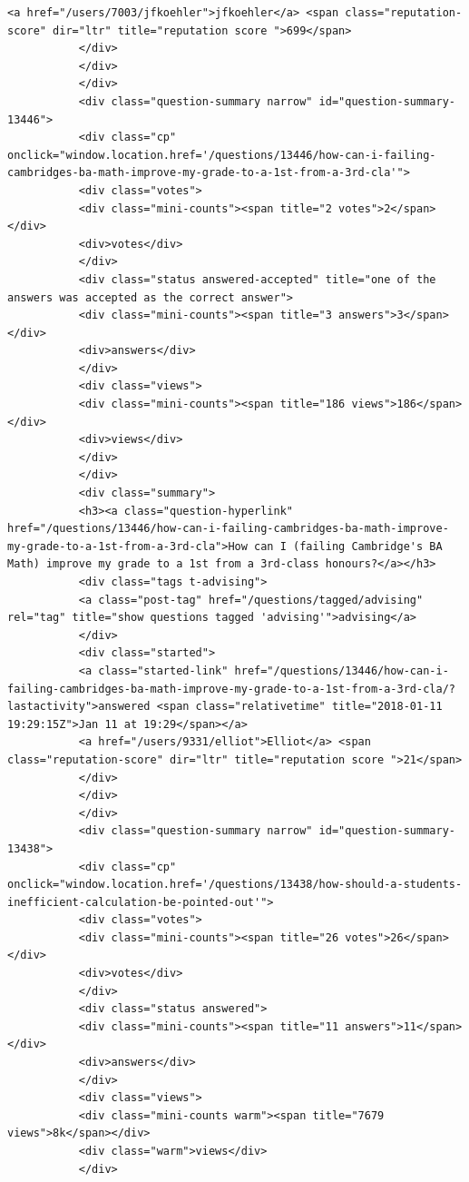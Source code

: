 \documentclass[11pt]{article}
\begin{document}
\begin{Verbatim}[commandchars=\\\{\}]
           <a href="/users/7003/jfkoehler">jfkoehler</a> <span class="reputation-score" dir="ltr" title="reputation score ">699</span>
           </div>
           </div>
           </div>
           <div class="question-summary narrow" id="question-summary-13446">
           <div class="cp" onclick="window.location.href='/questions/13446/how-can-i-failing-cambridges-ba-math-improve-my-grade-to-a-1st-from-a-3rd-cla'">
           <div class="votes">
           <div class="mini-counts"><span title="2 votes">2</span></div>
           <div>votes</div>
           </div>
           <div class="status answered-accepted" title="one of the answers was accepted as the correct answer">
           <div class="mini-counts"><span title="3 answers">3</span></div>
           <div>answers</div>
           </div>
           <div class="views">
           <div class="mini-counts"><span title="186 views">186</span></div>
           <div>views</div>
           </div>
           </div>
           <div class="summary">
           <h3><a class="question-hyperlink" href="/questions/13446/how-can-i-failing-cambridges-ba-math-improve-my-grade-to-a-1st-from-a-3rd-cla">How can I (failing Cambridge's BA Math) improve my grade to a 1st from a 3rd-class honours?</a></h3>
           <div class="tags t-advising">
           <a class="post-tag" href="/questions/tagged/advising" rel="tag" title="show questions tagged 'advising'">advising</a>
           </div>
           <div class="started">
           <a class="started-link" href="/questions/13446/how-can-i-failing-cambridges-ba-math-improve-my-grade-to-a-1st-from-a-3rd-cla/?lastactivity">answered <span class="relativetime" title="2018-01-11 19:29:15Z">Jan 11 at 19:29</span></a>
           <a href="/users/9331/elliot">Elliot</a> <span class="reputation-score" dir="ltr" title="reputation score ">21</span>
           </div>
           </div>
           </div>
           <div class="question-summary narrow" id="question-summary-13438">
           <div class="cp" onclick="window.location.href='/questions/13438/how-should-a-students-inefficient-calculation-be-pointed-out'">
           <div class="votes">
           <div class="mini-counts"><span title="26 votes">26</span></div>
           <div>votes</div>
           </div>
           <div class="status answered">
           <div class="mini-counts"><span title="11 answers">11</span></div>
           <div>answers</div>
           </div>
           <div class="views">
           <div class="mini-counts warm"><span title="7679 views">8k</span></div>
           <div class="warm">views</div>
           </div>

\end{Verbatim}
\end{document}
